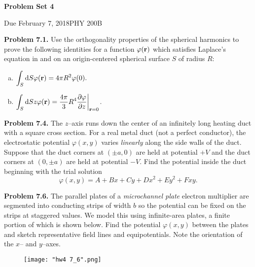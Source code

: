 \documentclass{article}
\newcommand{\Title}     {Problem Set 4}
\newcommand{\DueDate}   {February 7, 2018}
\newcommand{\Course}    {PHY 200B}
\begin{document}
{\huge\bf\Title}

Due \DueDate \hfill \Course


\noindent\begin{minipage}{\textwidth}
\hrulefill

\textbf{Problem 7.1.} Use the orthogonality properties of the spherical harmonics to prove the following identities for a function $\varphi(\vb{r})$ which satisfies Laplace's equation in and on an origin-centered spherical surface $S$ of radius $R$:
\begin{enumerate}[(a)]
    \item $\displaystyle{\int_S \dd S \varphi(\vb{r}) = 4\pi R^2 \varphi(0).}$
    \item $\displaystyle{\int_S \dd S z\varphi(\vb{r}) = \frac{4\pi}{3}R^4 \pdv{\varphi}{z}\bigg\rvert_{\vb{r}=0}}$.
\end{enumerate}

\end{minipage}
\vfill
\noindent\begin{minipage}{\textwidth}
\hrulefill

\textbf{Problem 7.4.} The $z$--axis runs down the center of an infinitely long heating duct with a square cross section. For a real metal duct (not a perfect conductor), the electrostatic potential $\varphi(x, y)$ varies \textit{linearly} along the side walls of the duct. Suppose that the duct corners at $(\pm a, 0)$ are held at potential $+V$ and the duct corners at $(0,\pm a)$ are held at potential $-V$. Find the potential inside the duct beginning with the trial solution
\[
    \varphi(x,y) = A + Bx + Cy + Dx^2 + Ey^2 + Fxy.
\]

\end{minipage}
\vfill
\noindent\begin{minipage}{\textwidth}
\hrulefill

\textbf{Problem 7.6.} The parallel plates of a \textit{microchannel plate} electron multiplier are segmented into conducting strips of width $b$ so the potential can be fixed on the strips at staggered values. We model this using infinite-area plates, a finite portion of which is shown below. Find the potential $\varphi(x, y)$ between the plates and sketch representative field lines and equipotentials. Note the orientation of the $x$-- and $y$--axes.

\begin{figure}[H]
\centering
\texttt{[image: "hw4 7\_6".png]}
\end{figure}

\end{minipage}
\end{document}
